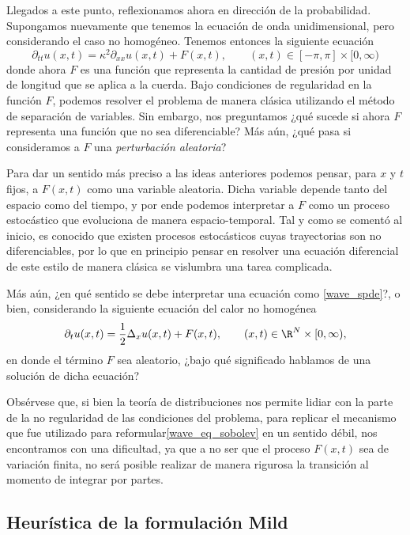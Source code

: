 Llegados a este punto, reflexionamos ahora en dirección de la probabilidad. Supongamos nuevamente que tenemos la ecuación de onda unidimensional, pero considerando el caso no homogéneo. Tenemos entonces la siguiente ecuación
\begin{equation}\label{wave_spde}
\partial_{tt}u(x,t)=\kappa^2\partial_{xx}u(x,t)+F(x,t), \qquad (x,t)\in [-\pi,\pi]\times[0,\infty)
\end{equation}
donde ahora $F$ es una función que representa la cantidad de presión por unidad de longitud que se aplica a la cuerda. Bajo condiciones de regularidad en la función $F$, podemos resolver el problema de manera clásica utilizando el método de separación de variables. Sin embargo, nos preguntamos ¿qué sucede si ahora $F$ representa una función que no sea diferenciable? Más aún, ¿qué pasa si consideramos a $F$ una \textit{perturbación aleatoria}?

Para dar un sentido más preciso a las ideas anteriores podemos pensar, para $x$ y $t$ fijos, a $F(x,t)$ como una variable aleatoria. Dicha variable depende tanto del espacio como del tiempo, y por ende podemos interpretar a $F$ como un proceso estocástico que evoluciona de manera espacio-temporal. Tal y como se comentó al inicio, es conocido que existen procesos estocásticos cuyas trayectorias son no diferenciables, por lo que en principio pensar en resolver una ecuación diferencial de este estilo de manera clásica se vislumbra una tarea complicada.

Más aún, ¿en qué sentido se debe interpretar una ecuación como \eqref{wave_spde}?, o bien, considerando la siguiente ecuación del calor no homogénea 
\begin{equation}\label{heat_spde}
    \partial_t{u(x,t)}=\frac{1}{2}\Delta_{x}u(x,t)+F(x,t), \qquad (x,t)\in \R^{N}\times[0,\infty),
\end{equation}
en donde el término $F$ sea aleatorio, ¿bajo qué significado hablamos de una solución de dicha ecuación?

Obsérvese que, si bien la teoría de distribuciones nos permite lidiar con la parte de la no regularidad de las condiciones del problema, para replicar el mecanismo que fue utilizado para reformular\eqref{wave_eq_sobolev} en un sentido débil, nos encontramos con una dificultad, ya que a no ser que el proceso $F(x,t)$ sea de variación finita, no será posible realizar de manera rigurosa la transición al momento de integrar por partes.

\subsection{Heurística de la formulación Mild}

